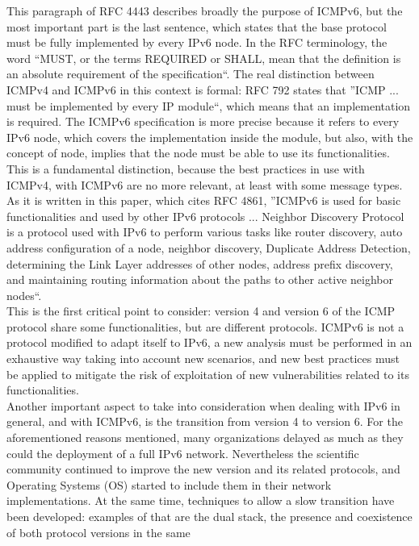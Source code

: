 \documentclass[12pt]{article}
\begin{document}
This paragraph of RFC 4443 describes broadly the purpose of ICMPv6, but the most important part is the last sentence, which states that the base protocol must be fully implemented by every IPv6 node. In the RFC 
terminology, the word “MUST, or the terms REQUIRED or SHALL, mean that the definition is an absolute requirement of the specification“\cite{rfc2119}. The real distinction between ICMPv4 and ICMPv6 in this context is formal: RFC 
792 states that ”ICMP ... must be implemented by every IP module“\cite{rfc792}, which means that an implementation is required. The ICMPv6 specification is more precise because it refers to every IPv6 node, which covers the 
implementation inside the module, but also, with the concept of node, implies that the node must be able to use its functionalities.\\
This is a fundamental distinction, because the best practices in use with ICMPv4, with ICMPv6 are no more relevant, at least with some message types. As it is written in this paper\cite{chak}, which cites RFC 4861\cite{rfc4861}, ”ICMPv6 is 
used for basic functionalities and used by other IPv6 protocols ... Neighbor Discovery Protocol is a protocol used with IPv6 to perform various tasks like router discovery, auto address configuration of a node, neighbor 
discovery, Duplicate Address Detection, determining the Link Layer addresses of other nodes, address prefix discovery, and maintaining routing information about the paths to other active neighbor nodes“.\\
This is the first critical point to consider: version 4 and version 6 of the ICMP protocol share some functionalities, but are different protocols. ICMPv6 is not a protocol modified to adapt itself to IPv6, a new analysis 
must be performed in an exhaustive way taking into account new scenarios, and new best practices must be applied to mitigate the risk of exploitation of new vulnerabilities related to its functionalities.\\
Another important aspect to take into consideration when dealing with IPv6 in general, and with ICMPv6, is the transition from version 4 to version 6. For the aforementioned reasons mentioned, many organizations 
delayed as much as they could the deployment of a full IPv6 network. Nevertheless the scientific community continued to improve the new version and its related protocols, and Operating Systems (OS) started to include 
them in their network implementations. At the same time, techniques to allow a slow transition have been developed: examples of that are the dual stack, the presence and coexistence of both protocol versions in the same 
\end{document}

